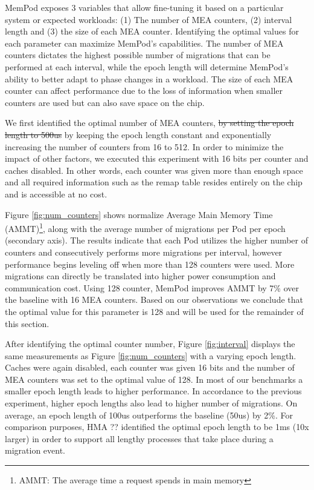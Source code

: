 MemPod exposes 3 variables that allow fine-tuning it based on a particular system or expected workloads: (1) The number of MEA counters, (2) interval length and (3) the size of each MEA counter. Identifying the optimal values for each parameter can maximize MemPod's capabilities. The number of MEA counters dictates the highest possible number of migrations that can be performed at each interval, while the epoch length will determine MemPod's ability to better adapt to phase changes in a workload. The size of each MEA counter can affect performance due to the loss of information when smaller counters are used but can also save space on the chip.

We first identified the optimal number of MEA counters, \sout{by setting the epoch length to 500us} by keeping the epoch length constant and exponentially increasing the number of counters from 16 to 512. In order to minimize the impact of other factors, we executed this experiment with 16 bits per counter and caches disabled. In other words, each counter was given more than enough space and all required information such as the remap table resides entirely on the chip and is accessible at no cost. 

Figure \ref{fig:num_counters} shows normalize Average Main Memory Time (AMMT)\footnote{AMMT: The average time a request spends in main memory}, along with the average number of migrations per Pod per epoch (secondary axis). The results indicate that each Pod utilizes the higher number of counters and consecutively performs more migrations per interval, however performance begins leveling off when more than 128 counters were used. More migrations can directly be translated into higher power consumption and communication cost. Using 128 counter, MemPod improves AMMT by 7\% over the baseline with 16 MEA counters. Based on our observations we conclude that the optimal value for this parameter is 128 and will be used for the remainder of this section.

After identifying the optimal counter number, Figure \ref{fig:interval} displays the same measurements as Figure \ref{fig:num_counters} with a varying epoch length. Caches were again disabled, each counter was given 16 bits and the number of MEA counters was set to the optimal value of 128. In most of our benchmarks a smaller epoch length leads to higher performance. In accordance to the previous experiment, higher epoch lengths also lead to higher number of migrations. On average, an epoch length of 100us outperforms the baseline (50us) by 2\%. For comparison purposes, HMA ?? identified the optimal epoch length to be 1ms (10x larger) in order to support all lengthy processes that take place during a migration event.

